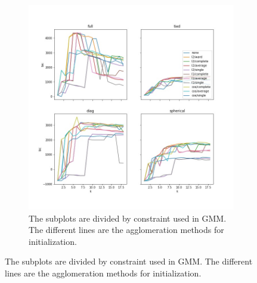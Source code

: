 \documentclass{article}
\begin{document}
\begin{figure}[h!]
\begin{subfigure}[b]{0.4\linewidth}
\end{subfigure} 
\begin{subfigure}[b]{0.4\linewidth}
  \includegraphics[width=\linewidth]{python_bicplot.jpg}
\caption{The subplots are divided by constraint used in GMM. The different lines are the agglomeration methods for initialization.}
\end{subfigure}
\end{figure} 

\newpage
\end{document}
